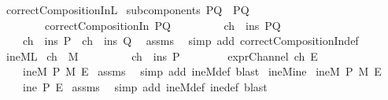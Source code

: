 \begin{isabellebody}
{}
%
\endisatagproof
{\isafoldproof}%
%
\isadelimproof
\isanewline
%
\endisadelimproof
{}\isamarkupfalse%
\ correctCompositionIn{\isacharunderscore}L{}{\isacharcolon}\isanewline
{}\ {\isachardoublequoteopen}subcomponents\ PQ\ {\isacharequal}\ {\isacharbraceleft}P{\isacharcomma}Q{\isacharbraceright}{\isachardoublequoteclose}\isanewline
\ \ \ \ \ \ \ \ {\isachardoublequoteopen}correctCompositionIn\ PQ{\isachardoublequoteclose}\ \isanewline
\ \ \ \ \ \ \ \ {\isachardoublequoteopen}ch\ {\isasymin}\ ins\ PQ{\isachardoublequoteclose}\ \isanewline
{}\ \ \ \ {\isachardoublequoteopen}{\isacharparenleft}ch\ {\isasymin}\ ins\ P{\isacharparenright}\ {\isasymor}\ {\isacharparenleft}ch\ {\isasymin}\ ins\ Q{\isacharparenright}{\isachardoublequoteclose}\ \isanewline
%
\isadelimproof
%
\endisadelimproof
%
\isatagproof
{}\isamarkupfalse%
\ assms\ \isamarkupfalse%
\ {\isacharparenleft}simp\ add{\isacharcolon}\ correctCompositionIn{\isacharunderscore}def{\isacharparenright}%
\endisatagproof
{\isafoldproof}%
%
\isadelimproof
\isanewline
%
\endisadelimproof
\isanewline
{}\isamarkupfalse%
\ ineM{\isacharunderscore}L{}{\isacharcolon}\isanewline
{}\ {\isachardoublequoteopen}ch\ {\isasymin}\ M{\isachardoublequoteclose}\ \isanewline
\ \ \ \ \ \ \ \ {\isachardoublequoteopen}ch\ {\isasymin}\ ins\ P{\isachardoublequoteclose}\isanewline
\ \ \ \ \ \ \ \ {\isachardoublequoteopen}exprChannel\ ch\ E{\isachardoublequoteclose}\isanewline
{}\ \ \ \ {\isachardoublequoteopen}ineM\ P\ M\ E{\isachardoublequoteclose}\isanewline
%
\isadelimproof
%
\endisadelimproof
%
\isatagproof
{}\isamarkupfalse%
\ assms\ \isamarkupfalse%
\ {\isacharparenleft}simp\ add{\isacharcolon}\ ineM{\isacharunderscore}def{\isacharcomma}\ blast{\isacharparenright}%
\endisatagproof
{\isafoldproof}%
%
\isadelimproof
\isanewline
%
\endisadelimproof
\isanewline
{}\isamarkupfalse%
\ ineM{\isacharunderscore}ine{\isacharcolon}\isanewline
{}\ {\isachardoublequoteopen}ineM\ P\ M\ E{\isachardoublequoteclose}\isanewline
{}\ \ \ \ {\isachardoublequoteopen}ine\ P\ E{\isachardoublequoteclose}\isanewline
%
\isadelimproof
%
\endisadelimproof
%
\isatagproof
{}\isamarkupfalse%
\ assms\ \isamarkupfalse%
\ {\isacharparenleft}simp\ add{\isacharcolon}\ ineM{\isacharunderscore}def\ ine{\isacharunderscore}def{\isacharcomma}\ blast{\isacharparenright}%

\end{isabellebody}

